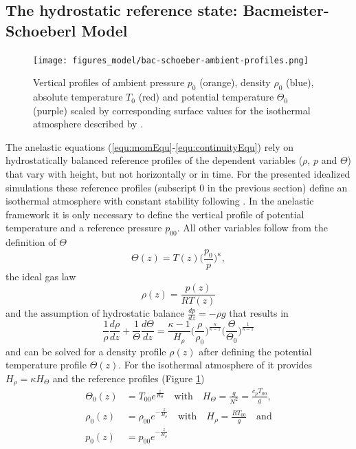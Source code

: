 \subsection*{The hydrostatic reference state: Bacmeister-Schoeberl Model}
\begin{figure}[tbp]
    \centering
    \texttt{[image: figures\_model/bac-schoeber-ambient-profiles.png]}
    \caption{Vertical profiles of ambient pressure $p_0$ (orange), density $\rho_0$ (blue), absolute temperature $T_0$ (red) and potential temperature $\Theta_0$ (purple) scaled by corresponding surface values for the isothermal atmosphere described by \textcite[]{bacmeister_breakdown_1989}.}
    \label{fig:ambient_profs}
\end{figure}
\label{sec:ambient-profiles}
The anelastic equations (\ref{equ:momEqu}-\ref{equ:continuityEqu}) rely on hydrostatically balanced reference profiles of the dependent variables ($\rho$, $p$ and $\Theta$) that vary with height, but not horizontally or in time. For the presented idealized simulations these reference profiles (subscript 0 in the previous section) define an isothermal atmosphere with constant stability following \textcite{bacmeister_breakdown_1989}. In the anelastic framework it is only necessary to define the vertical profile of potential temperature and a reference pressure $p_{00}$. All other variables follow from the definition of $\Theta$
\begin{equation}
    \Theta(z) = T(z) \biggl(\frac{p_{0}}{p}\biggr)^{\kappa},
    \label{equ:poissonEqu}
\end{equation}
the ideal gas law
\begin{equation}
    \rho(z) = \frac{p(z)}{R T(z)}
    \label{equ:idealGas}
\end{equation}
and the assumption of hydrostatic balance $\frac{dp}{dz}=-\rho g$ that results in
\begin{equation}
    \frac{1}{\rho} \frac{d \rho}{dz} + \frac{1}{\Theta} \frac{d \Theta}{dz} = \frac{\kappa-1}{H_{\rho}} \biggl(\frac{\rho}{\rho_0} \biggr)^{\frac{\kappa}{\kappa-1}} \biggl(\frac{\Theta}{\Theta_0} \biggr)^{\frac{1}{\kappa-1}}
    \label{equ:hydro-balance}
\end{equation}
and can be solved for a density profile $\rho(z)$ after defining the potential temperature profile $\Theta(z)$. For the isothermal atmosphere of \textcite[]{bacmeister_breakdown_1989} it provides $H_{\rho} = \kappa H_{\Theta}$ and the reference profiles (Figure \ref{fig:ambient_profs})
\begin{equation}
    \begin{aligned}
        \Theta_0(z) &= T_{00} e^{\frac{z}{H_{\Theta}}} \quad \textrm{with} \quad H_{\Theta} = \frac{g}{N^2} = \frac{c_p T_{00}}{g}, \\
        \rho_0(z) &= \rho_{00} e^{-\frac{z}{H_{\rho}}} \quad \textrm{with} \quad H_{\rho} = \frac{R T_{00}}{g} \quad \textrm{and}  \\
        p_0(z) &= p_{00} e^{-\frac{z}{H_{\rho}}}
        \label{equ:ambient-profiles}
    \end{aligned}
\end{equation}
